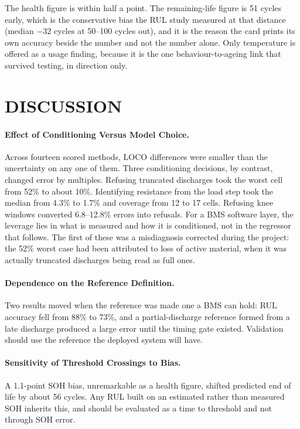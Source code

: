 The health figure is within half a point. The remaining-life figure is 51 cycles early, which is the conservative bias the RUL study measured at that distance (median $-32$ cycles at 50--100 cycles out), and it is the reason the card prints its own accuracy beside the number and not the number alone. Only temperature is offered as a usage finding, because it is the one behaviour-to-ageing link that survived testing, in direction only.

\section{DISCUSSION}
\label{sec:discussion}

\paragraph{Effect of Conditioning Versus Model Choice.} Across fourteen scored methods, LOCO differences were smaller than the uncertainty on any one of them. Three conditioning decisions, by contrast, changed error by multiples. Refusing truncated discharges took the worst cell from 52\% to about 10\%. Identifying resistance from the load step took the median from 4.3\% to 1.7\% and coverage from 12 to 17 cells. Refusing knee windows converted 6.8--12.8\% errors into refusals. For a BMS software layer, the leverage lies in what is measured and how it is conditioned, not in the regressor that follows. The first of these was a misdiagnosis corrected during the project: the 52\% worst case had been attributed to loss of active material, when it was actually truncated discharges being read as full ones.

\paragraph{Dependence on the Reference Definition.} Two results moved when the reference was made one a BMS can hold: RUL accuracy fell from 88\% to 73\%, and a partial-discharge reference formed from a late discharge produced a large error until the timing gate existed. Validation should use the reference the deployed system will have.

\paragraph{Sensitivity of Threshold Crossings to Bias.} A 1.1-point SOH bias, unremarkable as a health figure, shifted predicted end of life by about 56 cycles. Any RUL built on an estimated rather than measured SOH inherits this, and should be evaluated as a time to threshold and not through SOH error.

